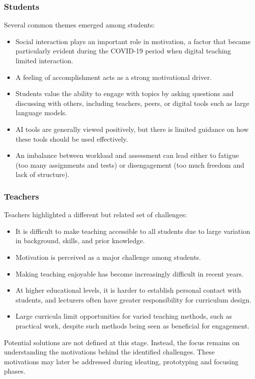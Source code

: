 \subsubsection{Students}
Several common themes emerged among students:
\begin{itemize}
    \item Social interaction plays an important role in motivation, a factor that became particularly evident during the COVID-19 period when digital teaching limited interaction.
    \item A feeling of accomplishment acts as a strong motivational driver.
    \item Students value the ability to engage with topics by asking questions and discussing with others, including teachers, peers, or digital tools such as large language models.
    \item AI tools are generally viewed positively, but there is limited guidance on how these tools should be used effectively.
    \item An imbalance between workload and assessment can lead either to fatigue (too many assignments and tests) or disengagement (too much freedom and lack of structure).
\end{itemize}

\subsubsection{Teachers}
Teachers highlighted a different but related set of challenges:
\begin{itemize}
    \item It is difficult to make teaching accessible to all students due to large variation in background, skills, and prior knowledge.
    \item Motivation is perceived as a major challenge among students.
    \item Making teaching enjoyable has become increasingly difficult in recent years.
    \item At higher educational levels, it is harder to establish personal contact with students, and lecturers often have greater responsibility for curriculum design.
    \item Large curricula limit opportunities for varied teaching methods, such as practical work, despite such methods being seen as beneficial for engagement.
\end{itemize}

Potential solutions are not defined at this stage. 
Instead, the focus remains on understanding the motivations behind the identified challenges. 
These motivations may later be addressed during ideating, prototyping and focusing phases.

